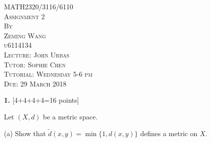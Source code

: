 \documentclass[11pt,a4paper]{amsart}
\begin{document}
\thispagestyle{empty}

\begin{center}
\huge
\vspace*{1.0in} MATH2320/3116/6110
\\\vspace{0.5in} \textsc{Assignment 2}
\normalsize
\\\vspace{0.5in} \textsc{By}
\\\vspace{0.1in} \textsc{Zeming Wang}
\\\vspace{0.1in} \textsc{u6114134}
\normalsize
\\\vspace{0.5in} \textsc{Lecture: John Urbas}
\\\vspace{0.1in} \textsc{Tutor: Sophie Chen}
\\\vspace{0.1in} \textsc{Tutorial: Wednesday 5-6 pm}
\normalsize
\\\vspace{0.5in} \textsc{Due: 29 March 2018}
\end{center}

\newpage
\setcounter{page}{1}




{\bf 1.} [4+4+4+4=16 points]

Let $(X,d)$ be a metric space.

(a) Show that  $\tilde d(x,y)=\min\{1,d(x,y) \}$ defines a metric on $X$.
\end{document}
